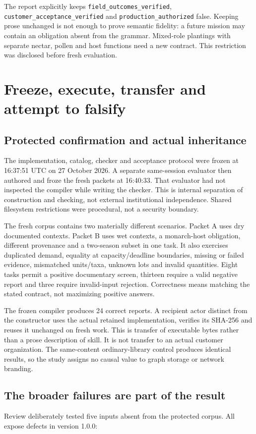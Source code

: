 \documentclass[11pt]{article}
\begin{document}
The report explicitly keeps \texttt{field\_outcomes\_verified}, \texttt{customer\_acceptance\_verified} and \texttt{production\_authorized} false. Keeping prose unchanged is not enough to prove semantic fidelity: a future mission may contain an obligation absent from the grammar. Mixed-role plantings with separate nectar, pollen and host functions need a new contract. This restriction was disclosed before fresh evaluation.

\Needspace{.3\textheight}
\section{Freeze, execute, transfer and attempt to falsify}
\subsection{Protected confirmation and actual inheritance}
The implementation, catalog, checker and acceptance protocol were frozen at 16:37:51 UTC on 27 October 2026. A separate same-session evaluator then authored and froze the fresh packets at 16:40:33. That evaluator had not inspected the compiler while writing the checker. This is internal separation of construction and checking, not external institutional independence. Shared filesystem restrictions were procedural, not a security boundary.

The fresh corpus contains two materially different scenarios. Packet A uses dry documented contexts. Packet B uses wet contexts, a monarch-host obligation, different provenance and a two-season subset in one task. It also exercises duplicated demand, equality at capacity/deadline boundaries, missing or failed evidence, mismatched units/taxa, unknown lots and invalid quantities. Eight tasks permit a positive documentary screen, thirteen require a valid negative report and three require invalid-input rejection. Correctness means matching the stated contract, not maximizing positive answers.

The frozen compiler produces 24 correct reports. A recipient actor distinct from the constructor uses the actual retained implementation, verifies its SHA-256 and reuses it unchanged on fresh work. This is transfer of executable bytes rather than a prose description of skill. It is not transfer to an actual customer organization. The same-content ordinary-library control produces identical results, so the study assigns no causal value to graph storage or network branding.

\subsection{The broader failures are part of the result}
 Review deliberately tested five inputs absent from the protected corpus. All expose defects in version 1.0.0:
\end{document}
